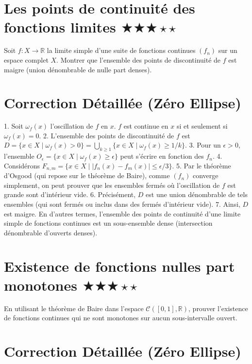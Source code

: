 \documentclass[11pt,a4paper]{article}
\begin{document}
\section{Les points de continuité des fonctions limites \quad $\bigstar\bigstar\bigstar\star\star$}

Soit $f: X \to \mathbb{R}$ la limite simple d'une suite de fonctions continues $(f_n)$ sur un espace complet $X$. Montrer que l'ensemble des points de discontinuité de $f$ est maigre (union dénombrable de nulle part denses).

\section{Correction Détaillée (Zéro Ellipse)}


1. Soit $\omega_f(x)$ l'oscillation de $f$ en $x$. $f$ est continue en $x$ si et seulement si $\omega_f(x) = 0$.
2. L'ensemble des points de discontinuité de $f$ est $D = \{x \in X \mid \omega_f(x) > 0\} = \bigcup_{k \geq 1} \{x \in X \mid \omega_f(x) \geq 1/k\}$.
3. Pour un $\epsilon > 0$, l'ensemble $O_\epsilon = \{x \in X \mid \omega_f(x) \geq \epsilon\}$ peut s'écrire en fonction des $f_n$.
4. Considérons $F_{n, m} = \{x \in X \mid |f_n(x) - f_m(x)| \leq \epsilon / 3\}$.
5. Par le théorème d'Osgood (qui repose sur le théorème de Baire), comme $(f_n)$ converge simplement, on peut prouver que les ensembles fermés où l'oscillation de $f$ est grande sont d'intérieur vide.
6. Précisément, $D$ est une union dénombrable de tels ensembles (qui sont fermés ou inclus dans des fermés d'intérieur vide).
7. Ainsi, $D$ est maigre. En d'autres termes, l'ensemble des points de continuité d'une limite simple de fonctions continues est un sous-ensemble dense (intersection dénombrable d'ouverts denses).


\newpage

\section{Existence de fonctions nulles part monotones \quad $\bigstar\bigstar\bigstar\star\star$}

En utilisant le théorème de Baire dans l'espace $\mathcal{C}([0,1], \mathbb{R})$, prouver l'existence de fonctions continues qui ne sont monotones sur aucun sous-intervalle ouvert.

\section{Correction Détaillée (Zéro Ellipse)}
\end{document}
